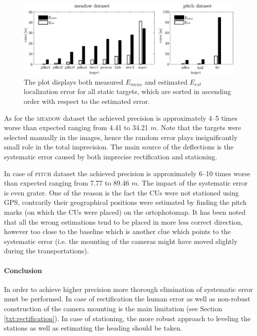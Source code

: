 \begin{figure}[htb]\centering
	\centering
	\includegraphics[width=0.98\linewidth]{fig/plot_static_targets.pdf}
	\caption{The plot displays both measured $E_{meas}$ and estimated $E_{est}$ localization error for all static targets, which are sorted in ascending order with respect to the estimated error.}
	\label{fig:plot_error_estatic_targets}
\end{figure}

As for the \textsc{meadow} dataset the achieved precision is approximately 4--5 times worse than expected ranging from 4.41 to 34.21 $m$. Note that the targets were selected manually in the images, hence the random error plays insignificantly small role in the total imprecision. The main source of the deflections is the systematic error caused by both imprecise rectification and stationing. 

In case of \textsc{pitch} dataset the achieved precision is approximately 6--10 times worse than expected ranging from 7.77 to 89.46 $m$. The impact of the systematic error is even grater. One of the reason is the fact the CUs were not stationed using GPS, contrarily their geographical positions were estimated by finding the pitch marks (on which the CUs were placed) on the ortophotomap. It has been noted that all the wrong estimations tend to be placed in more less correct direction, however too close to the baseline which is another clue which points to the systematic error (i.e. the mounting of the cameras might have moved slightly during the transportations).

\paragraph{Conclusion} In order to achieve higher precision more thorough elimination of systematic error must be performed. In case of rectification the human error as well as non-robust construction of the camera mounting is the main limitation (see Section \ref{txt:rectification}). In case of stationing, the more robust approach to leveling the stations as well as estimating the heading should be taken.

